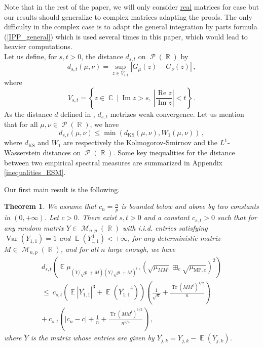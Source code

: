 \documentclass[11pt,a4paper]{article}
\DeclareMathOperator{\E}{\mathbb{E}}
\DeclareMathOperator{\R}{\mathbb{R}}
\DeclareMathOperator{\C}{\mathbb{C}}
\DeclareMathOperator{\MM}{\mathcal{M}}
\DeclareMathOperator{\PP}{\mathcal{P}}
\DeclareMathOperator{\1}{\mathbf{1}}
\DeclareMathOperator{\Reel}{\mathrm{Re}}
\DeclareMathOperator{\Imag}{\mathrm{Im}}
\DeclareMathOperator{\Var}{\mathrm{Var}}
\DeclareMathOperator{\Tr}{\mathrm{Tr}}
\newcommand{\mump}{\mu_{\mathrm{MP},c}}
\newcommand{\dKS}{d_{\mathrm{KS}}}
\newtheorem{Theorem}[Proposition]{Theorem}
\theoremstyle{definition}
\begin{document}
Note that in the rest of the paper, we will only consider \underline{real} matrices for ease but our results should generalize to complex matrices adapting the proofs. The only difficulty in the complex case is to adapt the general integration by parts formula (\ref{IPP_general}) which is used several times in this paper, which would lead to heavier computations.\\

Let us define, for $s,t>0$, the distance $d_{s,t}$ on $\PP(\R)$ by
\begin{equation} \label{dst}
d_{s,t}(\mu,\nu) = \sup_{z \in V_{s,t}} \left| G_{\mu}(z) - G_{\nu}(z) \right| \, ,
\end{equation}
where
\begin{equation} \label{Vst}
V_{s,t} = \left\{ z \in \C \ | \ \Imag z > s, \ \left| \frac{\Reel z}{\Imag z} \right| < t \right\} \, .
\end{equation}
As the distance $d$ defined in \cite{BC}, $d_{s,t}$ metrizes weak convergence. Let us mention that for all $\mu,\nu \in \PP(\R)$, we have
\begin{equation} \label{comparison_distances}
d_{s,t}(\mu,\nu) \le \min \left( \dKS(\mu,\nu) , W_1(\mu,\nu) \right) \, ,
\end{equation}
where $\dKS$ and $W_1$ are respectively the Kolmogorov-Smirnov and the $L^1$-Wasserstein distances on $\PP(\R)$. Some key inequalities for the distance between two empirical spectral measures are summarized in Appendix \ref{inequalities_ESM}.

Our first main result is the following.

\begin{Theorem} \label{theorem1}
We assume that $c_n = \frac{n}{p}$ is bounded below and above by two constants in $(0,+\infty)$. Let $c>0$. There exist $s,t>0$ and a constant $c_{s,t}>0$ such that for any random matrix $Y \in \MM_{n,p}(\R)$ with i.i.d. entries satisfying $\Var(Y_{1,1})=1$ and $\E(Y_{1,1}^4) < +\infty$, for any deterministic matrix $M \in \MM_{n,p}(\R)$, and for all $n$ large enough, we have
\begin{multline*}
d_{s,t} \left( \E \mu_{(Y/\sqrt{p}+M)(Y/\sqrt{p}+M)^t} , \left( \sqrt{\mu_{MM^t}} \boxplus_c \sqrt{\mump} \right)^2 \right) \\
\le \ c_{s,t} \left( \E |\mathring{Y_{1,1}}|^3 + \E(\mathring{Y_{1,1}}^4) \right) \left( \frac{1}{\sqrt{n}} + \frac{\Tr(MM^t)^{1/2}}{n} \right) \\
+ \ c_{s,t} \left( |c_n-c| + \frac1n + \frac{\Tr(MM^t)^{1/2}}{n^{5/4}} \right) \, ,
\end{multline*}
where $\mathring{Y}$ is the matrix whose entries are given by $\mathring{Y_{j,k}} = Y_{j,k} - \E(Y_{j,k})$.
\end{Theorem}
\end{document}
